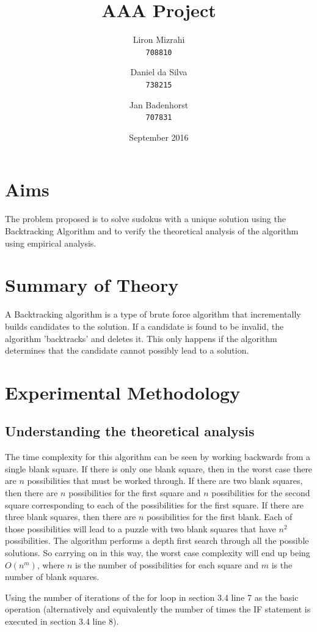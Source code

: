 \documentclass{article}
\title{AAA Project}
\date{September 2016}
\author{
  Liron Mizrahi\\
  \texttt{708810}
  \and
  Daniel da Silva\\
  \texttt{738215}
  \and
  Jan Badenhorst\\
  \texttt{707831}
}
\begin{document}
\maketitle

\section{Aims}
The problem proposed is to solve sudokus with a unique solution using the Backtracking Algorithm and to verify the theoretical analysis of the algorithm using empirical analysis.

\section{Summary of Theory}
A Backtracking algorithm is a type of brute force algorithm that incrementally builds candidates to the solution. If a candidate is found to be invalid, the algorithm 'backtracks' and deletes it. This only happens if the algorithm determines that the candidate cannot possibly lead to a solution.

\section{Experimental Methodology}
\subsection{Understanding the theoretical analysis}
The time complexity for this algorithm can be seen by working backwards from a single blank square. If there is only one blank square, then in the worst case there are $n$ possibilities that must be worked through. If there are two blank squares, then there are $n$ possibilities for the first square and $n$ possibilities for the second square corresponding to each of the possibilities for the first square. If there are three blank squares, then there are $n$ possibilities for the first blank. Each of those possibilities will lead to a puzzle with two blank squares that have $n^2$ possibilities.
The algorithm performs a depth first search through all the possible solutions. So carrying on in this way, the worst case complexity will end up being $O(n^m)$, where $n$ is the number of possibilities for each square and $m$ is the number of blank squares.

Using the number of iterations of the for loop in section 3.4 line 7 as the basic operation (alternatively and equivalently the number of times the IF statement is executed in section 3.4 line 8).
\end{document}
